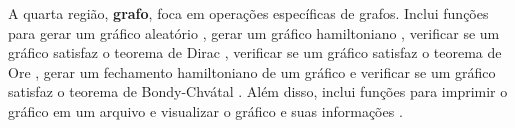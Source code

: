 \documentclass[12pt, openright, oneside, a4paper, chapter=TITLE, section=TITLE, subsection=TITLE, subsubsection=TITLE, brazil]{abntex2}
\begin{document}
\hspace{1.25cm}A quarta região, \textbf{grafo}, foca em operações específicas de grafos. Inclui funções para gerar um gráfico aleatório , gerar um gráfico hamiltoniano , verificar se um gráfico satisfaz o teorema de Dirac , verificar se um gráfico satisfaz o teorema de Ore , gerar um fechamento hamiltoniano de um gráfico  e verificar se um gráfico satisfaz o teorema de Bondy-Chvátal . Além disso, inclui funções para imprimir o gráfico em um arquivo  e visualizar o gráfico e suas informações .
\end{document}
